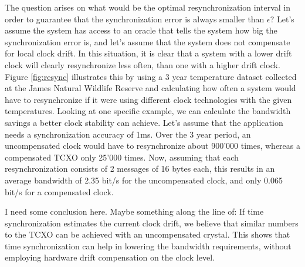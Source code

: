 The question arises on what would be the optimal resynchronization interval in
order to guarantee that the synchronization error is always smaller than
$\epsilon$? Let's assume the system has access to an oracle that tells the
system how big the synchronization error is, and let's assume that the system
does not compensate for local clock drift. In this situation, it is clear that
a system with a lower drift clock will clearly resynchronize less often, than
one with a higher drift clock. Figure \ref{fig:resync} illustrates this by
using a 3 year temperature dataset collected at the James Natural Wildlife Reserve
\cite{mosscam} and calculating how often a system would have to resynchronize
if it were using different clock technologies with the given temperatures.
Looking at one specific example, we can calculate the bandwidth savings a
better clock stability can achieve. Let's assume that the application needs a
synchronization accuracy of 1ms. Over the 3 year period, an uncompensated
clock would have to resynchronize about 900'000 times, whereas a compensated
TCXO only 25'000 times. Now, assuming that each resynchronization consists of
2 messages of 16 bytes each, this results in an average bandwidth of 
2.35 bit/s for the uncompensated clock, and only 0.065 bit/s for a compensated
clock.

I need some conclusion here. Maybe something along the line of: If time
synchronization estimates the current clock drift, we believe that similar numbers to the TCXO
can be achieved with an uncompensated crystal. This shows
that time synchronization can help in lowering the bandwidth requirements,
without employing hardware drift compensation on the clock level.

